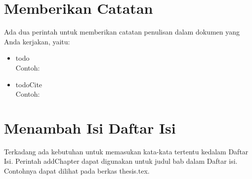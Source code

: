 \section{Memberikan Catatan}
Ada dua perintah untuk memberikan catatan penulisan dalam dokumen yang Anda 
kerjakan, yaitu: 
\begin{itemize}
	\item \bslash todo \\
		Contoh: \\ 
	\item \bslash todoCite \\ 
		Contoh: \todoCite
\end{itemize}


\section{Menambah Isi Daftar Isi}
Terkadang ada kebutuhan untuk memasukan kata-kata tertentu kedalam Daftar Isi. 
Perintah \bslash addChapter dapat digunakan untuk judul bab dalam Daftar isi. 
Contohnya dapat dilihat pada berkas thesis.tex.